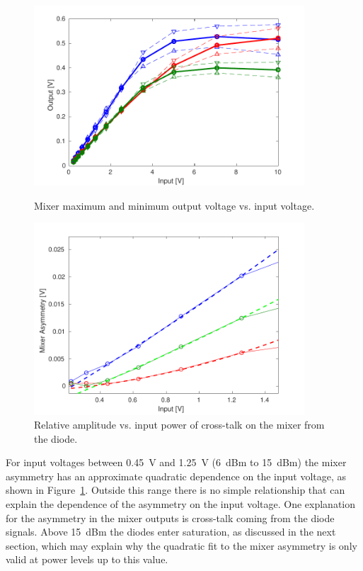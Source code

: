 \begin{figure}
  \centering
  \includegraphics[width=0.9\textwidth]{Figures/phaseMons/MixerVsVolts}
  \caption{Mixer maximum and minimum output voltage vs. input voltage.}
  \label{f:MixerVsVolts}
  \includegraphics[width=0.9\textwidth]{Figures/phaseMons/MixerAsymmetryVsVolts}
  \caption{Relative amplitude vs. input power of cross-talk on the mixer from the diode.}
  \label{f:MixerAsymmetryVsVolts}
\end{figure}
For input voltages between 0.45~V and 1.25~V (6~dBm to 15~dBm) the mixer asymmetry has an approximate quadratic dependence on the input voltage, as shown in Figure~\ref{f:MixerAsymmetryVsVolts}. Outside this range there is no simple relationship that can explain the dependence of the asymmetry on the input voltage. One explanation for the asymmetry in the mixer outputs is cross-talk coming from the diode signals. Above 15~dBm the diodes enter saturation, as discussed in the next section, which may explain why the quadratic fit to the mixer asymmetry is only valid at power levels up to this value. 

